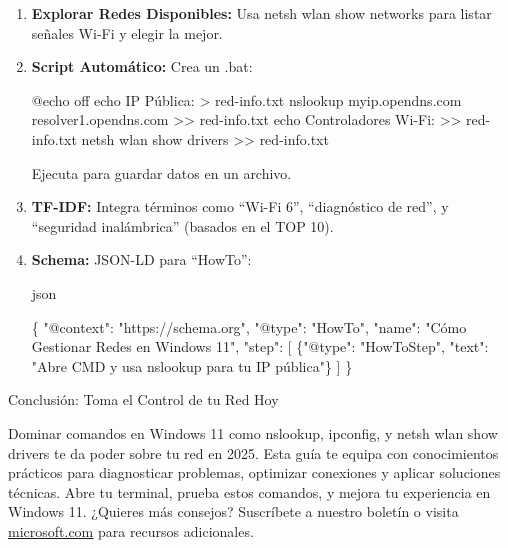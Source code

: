 \documentclass[
  doc,
  floatsintext,
  longtable,
  a4paper,
  nolmodern,
  notxfonts,
  notimes,
  12pt,
  colorlinks=true,linkcolor=blue,citecolor=blue,urlcolor=blue]{apa7}
\newenvironment{Shaded}{\begin{snugshade}}{\end{snugshade}}
\newcommand{\DataTypeTok}[1]{\textcolor[rgb]{0.68,0.00,0.00}{#1}}
\newcommand{\FunctionTok}[1]{\textcolor[rgb]{0.28,0.35,0.67}{#1}}
\newcommand{\NormalTok}[1]{\textcolor[rgb]{0.00,0.23,0.31}{#1}}
\newcommand{\OtherTok}[1]{\textcolor[rgb]{0.00,0.23,0.31}{#1}}
\newcommand{\StringTok}[1]{\textcolor[rgb]{0.13,0.47,0.30}{#1}}
\begin{document}
\begin{enumerate}
\def\labelenumi{\arabic{enumi}.}
\item
  \textbf{Explorar Redes Disponibles:} Usa netsh wlan show networks para
  listar señales Wi-Fi y elegir la mejor.
\item
  \textbf{Script Automático:} Crea un .bat:

\begin{Shaded}
\begin{Highlighting}[]
\NormalTok{@echo off}
\NormalTok{echo IP Pública: \textgreater{} red{-}info.txt}
\NormalTok{nslookup myip.opendns.com resolver1.opendns.com \textgreater{}\textgreater{} red{-}info.txt}
\NormalTok{echo Controladores Wi{-}Fi: \textgreater{}\textgreater{} red{-}info.txt}
\NormalTok{netsh wlan show drivers \textgreater{}\textgreater{} red{-}info.txt}
\end{Highlighting}
\end{Shaded}

  Ejecuta para guardar datos en un archivo.
\item
  \textbf{TF-IDF:} Integra términos como ``Wi-Fi 6'', ``diagnóstico de
  red'', y ``seguridad inalámbrica'' (basados en el TOP 10).
\item
  \textbf{Schema:} JSON-LD para ``HowTo'':

  json

\begin{Shaded}
\begin{Highlighting}[]
\FunctionTok{\{}
  \DataTypeTok{"@context"}\FunctionTok{:} \StringTok{"https://schema.org"}\FunctionTok{,}
  \DataTypeTok{"@type"}\FunctionTok{:} \StringTok{"HowTo"}\FunctionTok{,}
  \DataTypeTok{"name"}\FunctionTok{:} \StringTok{"Cómo Gestionar Redes en Windows 11"}\FunctionTok{,}
  \DataTypeTok{"step"}\FunctionTok{:} \OtherTok{[}
    \FunctionTok{\{}\DataTypeTok{"@type"}\FunctionTok{:} \StringTok{"HowToStep"}\FunctionTok{,} \DataTypeTok{"text"}\FunctionTok{:} \StringTok{"Abre CMD y usa nslookup para tu IP pública"}\FunctionTok{\}}
  \OtherTok{]}
\FunctionTok{\}}
\end{Highlighting}
\end{Shaded}
\end{enumerate}

Conclusión: Toma el Control de tu Red Hoy

Dominar comandos en Windows 11 como nslookup, ipconfig, y netsh wlan
show drivers te da poder sobre tu red en 2025. Esta guía te equipa con
conocimientos prácticos para diagnosticar problemas, optimizar
conexiones y aplicar soluciones técnicas. Abre tu terminal, prueba estos
comandos, y mejora tu experiencia en Windows 11. ¿Quieres más consejos?
Suscríbete a nuestro boletín o visita
\href{https://microsoft.com/}{microsoft.com} para recursos adicionales.
\end{document}
